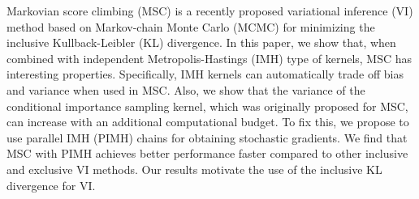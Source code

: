 
Markovian score climbing (MSC) is a recently proposed variational inference (VI) method based on Markov-chain Monte Carlo (MCMC) for minimizing the inclusive Kullback-Leibler (KL) divergence.
In this paper, we show that, when combined with independent Metropolis-Hastings (IMH) type of kernels, MSC has interesting properties.
Specifically, IMH kernels can automatically trade off bias and variance when used in MSC.
Also, we show that the variance of the conditional importance sampling kernel, which was originally proposed for MSC, can increase with an additional computational budget.
To fix this, we propose to use parallel IMH (PIMH) chains for obtaining stochastic gradients.
We find that MSC with PIMH achieves better performance faster compared to other inclusive and exclusive VI methods.
Our results motivate the use of the inclusive KL divergence for VI.

